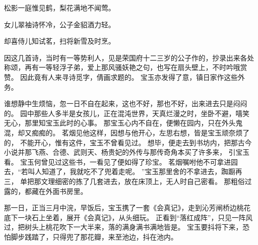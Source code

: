 松影一庭惟见鹤，梨花满地不闻莺。
\par
女儿翠袖诗怀冷，公子金貂酒力轻。
\par
却喜侍儿知试茗，扫将新雪及时烹。
\par
\hop
{}\par
\hop
因这几首诗，当时有一等势利人，见是荣国府十二三岁的公子作的，抄录出来各处称颂，再有一等轻浮子弟，爱上那风骚妖艳之句，也写在扇头壁上，不时吟哦赏赞。
因此竟有人来寻诗觅字，倩画求题的。
宝玉亦发得了意，镇日家作这些外务。
\par
谁想静中生烦恼，忽一日不自在起来，这也不好，那也不好，出来进去只是闷闷的。
园中那些人多半是女孩儿，正在混沌世界，天真烂漫之时，坐卧不避，嘻笑无心，那里知宝玉此时的心事。
那宝玉心内不自在，便懒在园内，只在外头鬼混，却又痴痴的。
茗烟见他这样，因想与他开心，左思右想，皆是宝玉顽奈烦了的，
不能开心，惟有这件，宝玉不曾看见过。
想毕，便走去到书坊内，把那古今小说并那飞燕、合德、武则天、杨贵妃的外传与那传奇角本买了许多来，
引宝玉看。
宝玉何曾见过这些书，一看见了便如得了珍宝。
茗烟嘱咐他不可拿进园去，“若叫人知道了，我就吃不了兜着走呢。
”宝玉那里舍的不拿进去，踟蹰再三，
单把那文理细密的拣了几套进去，放在床顶上，无人时自己密看。
那粗俗过露的，都藏在外面书房里。
\par
那一日，正当三月中浣，早饭后，宝玉携了一套《会真记》，走到沁芳闸桥边桃花底下一块石上坐着，展开《会真记》，从头细玩。
正看到“落红成阵”，只见一阵风过，把树头上桃花吹下一大半来，落的满身满书满地皆是。
宝玉要抖将下来，恐怕脚步践踏了，只得兜了那花瓣，来至池边，抖在池内。
